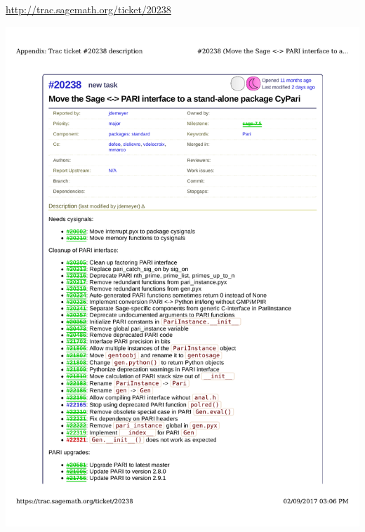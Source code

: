 \documentclass{deliverablereport}
\begin{document}
\enlargethispage{1cm}

\url{http://trac.sagemath.org/ticket/20238}

\includegraphics[clip, trim=2.2cm 2.5cm 2.2cm 2.5cm, width=1.00\textwidth]{ticket-20238}
\clearpage
\end{document}
